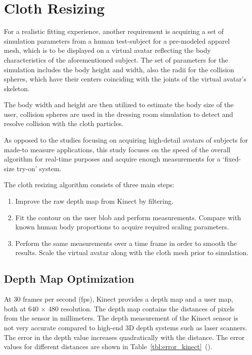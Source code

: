 \chapter{Cloth Resizing}
\label{chapter_cloth_resizing}
For a realistic fitting experience, another requirement is acquiring a set of simulation parameters from a human test-subject for a pre-modeled apparel mesh, which is to be displayed on a virtual avatar reflecting the body characteristics of the aforementioned subject.  The set of parameters for the simulation includes the body height and width, also the radii for the collision spheres, which have their centers coinciding with the joints of the virtual avatar's skeleton.
  
The body width and height are then utilized to estimate the body size of the user, collision spheres are used in the dressing room simulation to detect and resolve collision with the cloth particles.

As opposed to the studies focusing on acquiring high-detail avatars of subjects for made-to measure applications, this study focuses on the speed of the overall algorithm for real-time purposes and acquire enough measurements for a `fixed-size try-on' system.   

The cloth resizing algorithm consists of three main steps:
\begin{enumerate}
\item Improve the raw depth map from Kinect by filtering.
\item Fit the contour on the user blob and perform measurements. Compare with known human body proportions to acquire required scaling parameters.
\item Perform the same measurements over a time frame in order to smooth the results. Scale the virtual avatar along with the cloth mesh prior to simulation.
\end{enumerate}

\section{Depth Map Optimization}
\label{section_depth_map_optimization}
At 30 frames per second (fps), Kinect provides a depth map and a user map, both at 640 $\times$ 480 resolution. The depth map contains the distances of pixels from the sensor in millimeters. The depth measurement of the Kinect sensor is not very accurate compared to high-end 3D depth systems such as laser scanners. The error in the depth value increases quadratically with the distance. The error values for different distances are shown in Table~\ref{tbl:error_kinect}~(\cite{Kourosh2012}).

